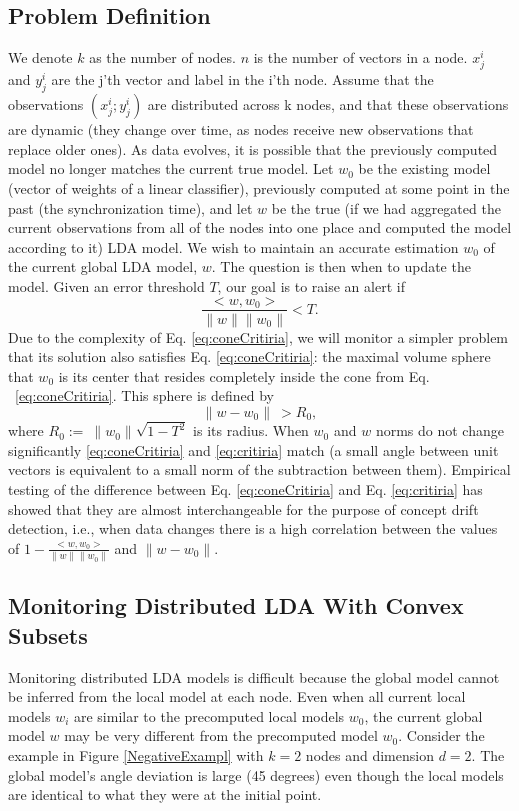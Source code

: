 \documentclass{sig-alternate-05-2015}
\begin{document}
\subsection{Problem Definition}
We denote $k$ as the number of nodes.
$n$ is the number of vectors in a node.
$x^i_j$ and $y^i_j$ are the j'th vector and label in the i'th node.
Assume that the observations ${(x^i_j; y^i_j)}$ are distributed across k nodes, 
and that these observations are dynamic (they change over time, as nodes receive 
new observations that replace older ones). 
As data evolves, it is possible that the previously computed model no longer 
matches the current true model. 
Let $w_0$ be the existing model (vector of weights of a linear classifier), 
previously computed at some point in the past (the synchronization time), 
and let $w$ be the true (if we had aggregated the current observations 
from all of the nodes into one place and computed the model according to it) LDA
model.
We wish to maintain an accurate estimation $w_0$ of the current global LDA model, $w$. 
The question is then when to update the model.
Given an error threshold $T$, our goal is to raise an alert if
\begin{equation} \label{eq:coneCritiria}
\frac{<w,w_0>}{\parallel w \parallel \parallel w_0 \parallel}  < T.
\end{equation}
Due to the complexity of Eq. \ref{eq:coneCritiria},
we will monitor a simpler problem that its solution also satisfies
Eq. \ref{eq:coneCritiria}: the maximal volume sphere that $w_0$ is its center
that resides completely inside the cone from Eq. ~\ref{eq:coneCritiria}.
This sphere is defined by
\begin{equation} \label{eq:critiria}
\parallel w-w_0 \parallel \  >  R_0,
\end{equation}
where $R_0 := \  \parallel w_0 \parallel \sqrt{1-T^2}$ is its radius.
When $w_0$ and $w$ norms do not change significantly \ref{eq:coneCritiria} and
\ref{eq:critiria} match (a small angle between unit vectors is
equivalent to a small norm of the subtraction between them).
Empirical testing of the difference between Eq. \ref{eq:coneCritiria} and
Eq. \ref{eq:critiria} has showed that they are almost interchangeable for the
purpose of concept drift detection, i.e., when data changes there is a high
correlation between the values of $1-\frac{<w,w_0>}{\parallel w \parallel
\parallel w_0 \parallel}$ and $\parallel w-w_0 \parallel $.

\subsection{Monitoring Distributed LDA With Convex Subsets}
Monitoring distributed LDA models is difficult because the
global model cannot be inferred from the local model at each
node. Even when all current local models $w_i$ are similar to the precomputed
local models $w_0$, the current global model $w$ may
be very different from the precomputed model $w_0$. Consider
the example in Figure \ref{NegativeExampl} with $k = 2$ nodes and dimension $d =
2$. The global model's angle deviation is large (45 degrees) even
though the local models are identical to what they were at the initial
point.
\end{document}
